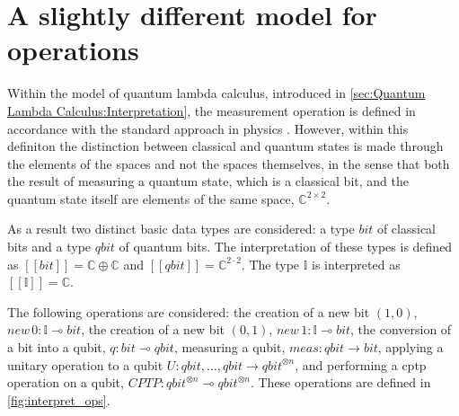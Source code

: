 





\section{A slightly different model for operations}


Within the model of quantum lambda calculus, introduced in \autoref{sec:Quantum Lambda Calculus:Interpretation}, the measurement operation is defined in accordance with the standard approach in physics \cite{watrous2018theory}. However, within this definiton the distinction between classical and quantum states is made through the elements of the spaces and not the spaces themselves, in the sense that both the result of measuring a quantum state, which is a classical bit, and the quantum state itself are elements of the same space, $\mathbb{C}^{2 \times 2}$. 

As a result two distinct basic data types are considered: a type $\textit{bit}$ of classical bits and a type $\textit{qbit}$ of quantum bits.  The interpretation of these types is defined as  $[\![\textit{bit}]\!]=\mathbb{C}\oplus\mathbb{C}$ and $[\![\textit{qbit}]\!]=\mathbb{C}^{2\cdot 2}$. The type $\mathbb{I}$ is interpreted as $[\![\mathbb{I}]\!]=\mathbb{C}$.


The following operations are considered: the creation of a new bit $(1,0)$, $\textit{new} \hspace{2pt} 0  :\mathbb{I}  \multimap \textit{bit} $, the creation of a new bit $(0,1)$, $\textit{new} \hspace{2pt} 1  :\mathbb{I}  \multimap \textit{bit} $, the conversion of a bit into a qubit, $q : \textit{bit}  \multimap \textit{qbit}$, measuring a qubit, $\textit{meas}:\textit{qbit} \xrightarrow{} \textit{bit}$, applying a unitary operation to a qubit $\textit{U}:\textit{qbit},\ldots,\textit{qbit} \xrightarrow{} \textit{qbit}^{\otimes n}$, and performing a \acrshort{cptp} operation on a qubit, $\textit{CPTP}: \textit{qbit}^{\otimes n} \multimap \textit{qbit}^{\otimes n}$. These operations are defined in \autoref{fig:interpret_ops}. 

